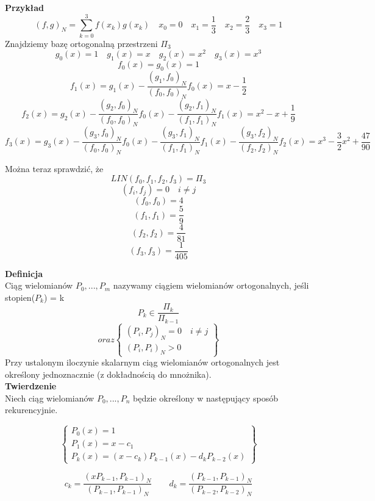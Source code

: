 \documentclass[polish]{kbk}
\begin{document}
  \textbf{Przykład} \\
  
  $$ (f,g)_N =  \sum_{k=0}^{3} f(x_k)g(x_k) \quad x_0 = 0 \quad x_1 = \frac{1}{3} \quad x_2 = \frac{2}{3} \quad x_3 = 1 $$  
  Znajdziemy bazę ortogonalną przestrzeni \( \Pi_3 \) \\
  $$ g_0(x) = 1 \quad g_1(x) = x \quad g_2(x) = x^2 \quad g_3(x) = x^3 $$
  $$ f_0(x) = g_0(x) = 1 $$
  $$ f_1(x) = g_1(x) - \frac{ (g_1, f_0)_N } { (f_0, f_0)_N } f_0(x) = x - \frac{1}{2} $$
  $$ f_2(x) = g_2(x) - \frac{ (g_2, f_0)_N } { (f_0, f_0)_N } f_0(x) -  \frac{ (g_2, f_1)_N } { (f_1, f_1)_N } f_1(x) = x^2 - x + \frac{1}{9} $$
  $$ f_3(x) = g_3(x) - \frac{ (g_3, f_0)_N } { (f_0, f_0)_N } f_0(x) -  \frac{ (g_3, f_1)_N } { (f_1, f_1)_N } f_1(x) -  \frac{ (g_3, f_2)_N } { (f_2, f_2)_N } f_2(x) = x^3 - \frac{ 3} {2}x^2 + \frac{47}{90} $$

Można teraz sprawdzić, że
$$ LIN ( f_0, f_1, f_2, f_3 ) = \Pi_3 $$
$$ (f_i, f_j) = 0 \quad i \neq j $$
$$ (f_0, f_0) = 4 $$
$$ (f_1, f_1) = \frac{5}{9} $$
$$ (f_2, f_2) = \frac{4}{81} $$
$$ (f_3, f_3) = \frac{1}{405} $$

  \textbf{Definicja} \\
  Ciąg wielomianów \( P_0, ..., P_m \) nazywamy ciągiem wielomianów ortogonalnych, jeśli \\stopien(\(P_k\)) = k
  $$ P_k  \in \frac{\Pi_k}{ \Pi_{k-1}} $$
      \[
   oraz \left\{\begin{array}{lr}
        (P_i, P_j)_N = 0 \quad i \neq j \\
       (P_i, P_i)_N > 0
        \end{array}\right\} 
  \]
  Przy ustalonym iloczynie skalarnym ciąg wielomianów ortogonalnych jest określony jednoznacznie (z dokładnością do mnożnika).\\

  \textbf{Twierdzenie} \\
  Niech ciąg wielomianów  \( P_0, ..., P_n \) będzie określony w następujący sposób rekurencyjnie.
  
        \[
	\left\{\begin{array}{lr}
	 P_0(x) = 1 \\
	 P_1(x) = x-c_1 \\
	 P_k(x) = (x-c_k)P_{k-1}(x) -d_kP_{k-2}(x)     
        \end{array}\right\} 
  \]
  
  $$ c_k = \frac { (xP_{k-1}, P_{k-1})_N }{ (P_{k-1}, P_{k-1})_N } \quad \quad d_k = \frac { (P_{k-1}, P_{k-1} )_N } { (P_{k-2}, P_{k-2})_N} $$
  
\end{document}
